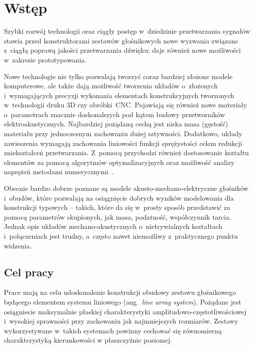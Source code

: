 \documentclass[12pt]{oska}
\affiliation{Akademia Górniczo-Hutnicza im. S. Staszica w Krakowie}
\begin{document}
	
	\maketitles
	
	\section{Wstęp}
	
	Szybki rozwój technologii oraz ciągły postęp w~dziedzinie przetwarzania sygnałów stawia przed konstruktorami zestawów głośnikowych nowe wyzwania związane z~ciągłą poprawą jakości przetwarzania dźwięku; daje również nowe możliwości w~zakresie prototypowania. 
	
	Nowe technologie nie tylko pozwalają tworzyć coraz bardziej złożone modele komputerowe, ale także dają możliwość tworzenia układów o~złożonych i~wymagających precyzji wykonania elementach konstrukcyjnych tworzonych w~technologii druku 3D czy obróbki~CNC. Pojawiają się również nowe materiały o~parametrach znacznie doskonalszych pod kątem budowy przetworników elektroakustycznych. Najbardziej pożądaną cechą jest niska masa (gęstość) materiału przy jednoczesnym zachowaniu dużej sztywności. Dodatkowo, układy zawieszenia wymagają zachowania liniowości funkcji sprężystości celem redukcji zniekształceń przetwarzania. Z~pomocą przychodzi również dostosowanie kształtu elementów za pomocą algorytmów optymalizacyjnych oraz możliwość analizy naprężeń metodami numerycznymi~\cite{naprezenia}.
	
	Obecnie bardzo dobrze poznane są modele akusto-mechano-elektryczne głośników i~obudów, które pozwalają na osiągnięcie dobrych wyników modelowania dla konstrukcji typowych -- takich, które da się w~prosty sposób przedstawić za pomocą parametrów skupionych, jak masa, podatność, współczynnik tarcia. Jednak opis układów mechano-akustycznych o~nietrywialnych kształtach i~połączeniach jest trudny, a~często nawet niemożliwy z~praktycznego punktu widzenia.
	
	\subsection{Cel pracy}
	
	Prace mają na celu udoskonalenie konstrukcji obudowy zestawu głośnikowego będącego elementem systemu liniowego (ang.~\textit{line array system}). Pożądane jest osiągniecie maksymalnie płaskiej charakterystyki amplitudowo-częstotliwościowej i~wysokiej sprawności przy zachowaniu jak najmniejszych rozmiarów. Zestawy wykorzystywane w~takich systemach powinny cechować się równomierną charakterystyką kierunkowości w płaszczyźnie poziomej.
	
\end{document}
